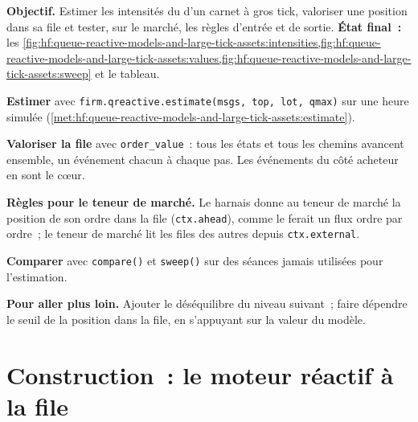 \begin{tutorial}
\textbf{Objectif.} Estimer les intensités du  d'un carnet à gros tick, valoriser une position dans sa file et tester, sur le
marché, les règles d'entrée et de sortie. \textbf{État final~:} les \cref{fig:hf:queue-reactive-models-and-large-tick-assets:intensities,fig:hf:queue-reactive-models-and-large-tick-assets:values,fig:hf:queue-reactive-models-and-large-tick-assets:sweep}
et le tableau.
\begin{tutsteps}
\item \textbf{Estimer} avec \texttt{firm.qreactive.estimate(msgs, top, lot, qmax)} sur une heure simulée (\cref{met:hf:queue-reactive-models-and-large-tick-assets:estimate}).
\item \textbf{Valoriser la file} avec \texttt{order\_value}~: tous les états et tous les chemins avancent ensemble, un événement chacun à chaque pas. Les événements du côté acheteur
en sont le cœur.
\label{lst:hf:queue-reactive-models-and-large-tick-assets:mc}
\item \textbf{Règles pour le teneur de marché.} Le harnais donne au teneur de marché la position de son ordre dans la file (\texttt{ctx.ahead}), comme le ferait un flux
ordre par ordre~; le teneur de marché lit les files des autres depuis \texttt{ctx.external}.
\label{lst:hf:queue-reactive-models-and-large-tick-assets:quoter}
\item \textbf{Comparer} avec \texttt{compare()} et \texttt{sweep()} sur des séances jamais utilisées pour l'estimation.
\end{tutsteps}
\textbf{Pour aller plus loin.} Ajouter le déséquilibre du niveau suivant~; faire dépendre le seuil de la position dans la file, en s'appuyant sur la valeur du modèle.
\end{tutorial}

\section{Construction~: le moteur réactif à la file}\label{bld:hf:queue-reactive-models-and-large-tick-assets:qreactive}

